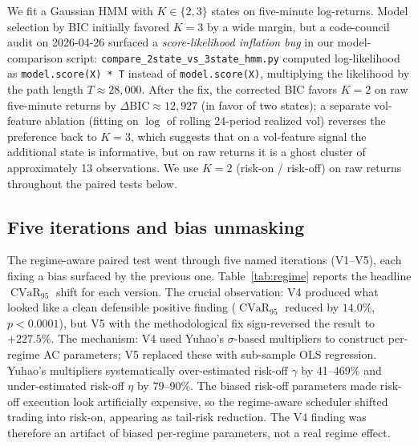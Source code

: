 \documentclass[11pt,letterpaper]{article}
\newcommand{\CVaR}{\operatorname{CVaR}}
\begin{document}
We fit a Gaussian HMM with \(K\in\{2,3\}\) states on five-minute log-returns. Model selection by BIC initially favored \(K=3\) by a wide margin, but a code-council audit on 2026-04-26 surfaced a \emph{score-likelihood inflation bug} in our model-comparison script: \texttt{compare\_2state\_vs\_3state\_hmm.py} computed log-likelihood as \texttt{model.score(X) * T} instead of \texttt{model.score(X)}, multiplying the likelihood by the path length \(T\approx 28{,}000\). After the fix, the corrected BIC favors \(K=2\) on raw five-minute returns by \(\Delta\mathrm{BIC}\approx 12{,}927\) (in favor of two states); a separate vol-feature ablation (fitting on \(\log\) of rolling 24-period realized vol) reverses the preference back to \(K=3\), which suggests that on a vol-feature signal the additional state is informative, but on raw returns it is a ghost cluster of approximately 13 observations. We use \(K=2\) (risk-on / risk-off) on raw returns throughout the paired tests below.

\subsection{Five iterations and bias unmasking}

The regime-aware paired test went through five named iterations (V1--V5), each fixing a bias surfaced by the previous one. Table~\ref{tab:regime} reports the headline \(\CVaR_{95}\) shift for each version. The crucial observation: V4 produced what looked like a clean defensible positive finding (\(\CVaR_{95}\) reduced by \(14.0\%\), \(p<0.0001\)), but V5 with the methodological fix sign-reversed the result to \(+227.5\%\). The mechanism: V4 used Yuhao's \(\sigma\)-based multipliers to construct per-regime AC parameters; V5 replaced these with sub-sample OLS regression. Yuhao's multipliers systematically over-estimated risk-off \(\gamma\) by 41--469\% and under-estimated risk-off \(\eta\) by 79--90\%. The biased risk-off parameters made risk-off execution look artificially expensive, so the regime-aware scheduler shifted trading into risk-on, appearing as tail-risk reduction. The V4 finding was therefore an artifact of biased per-regime parameters, not a real regime effect.
\end{document}
